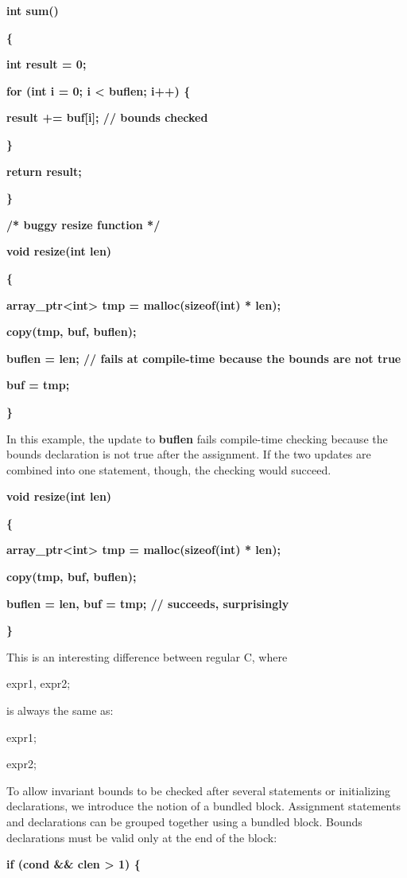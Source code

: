 \documentclass[]{article}
\begin{document}
\textbf{int sum()}

\textbf{\{}

\textbf{int result = 0;}

\textbf{for (int i = 0; i \textless{} buflen; i++) \{}

\textbf{result += buf{[}i{]}; // bounds checked}

\textbf{\}}

\textbf{return result;}

\textbf{\}}

\textbf{/* buggy resize function */}

\textbf{void resize(int len) }

\textbf{\{}

\textbf{array\_ptr\textless{}int\textgreater{} tmp = malloc(sizeof(int)
* len);}

\textbf{copy(tmp, buf, buflen);}

\textbf{buflen = len; // fails at compile-time because the bounds are
not true}

\textbf{buf = tmp;}

\textbf{\}}

In this example, the update to \textbf{buflen} fails compile-time
checking because the bounds declaration is not true after the
assignment. If the two updates are combined into one statement, though,
the checking would succeed.

\textbf{void resize(int len) }

\textbf{\{}

\textbf{array\_ptr\textless{}int\textgreater{} tmp = malloc(sizeof(int)
* len);}

\textbf{copy(tmp, buf, buflen);}

\textbf{buflen = len, buf = tmp; // succeeds, surprisingly}

\textbf{\}}

This is an interesting difference between regular C, where

expr1, expr2;

is always the same as:

expr1;

expr2;

To allow invariant bounds to be checked after several statements or
initializing declarations, we introduce the notion of a bundled block.
Assignment statements and declarations can be grouped together using a
bundled block. Bounds declarations must be valid only at the end of the
block:

\textbf{if (cond \&\& clen \textgreater{} 1) \{}
\end{document}

